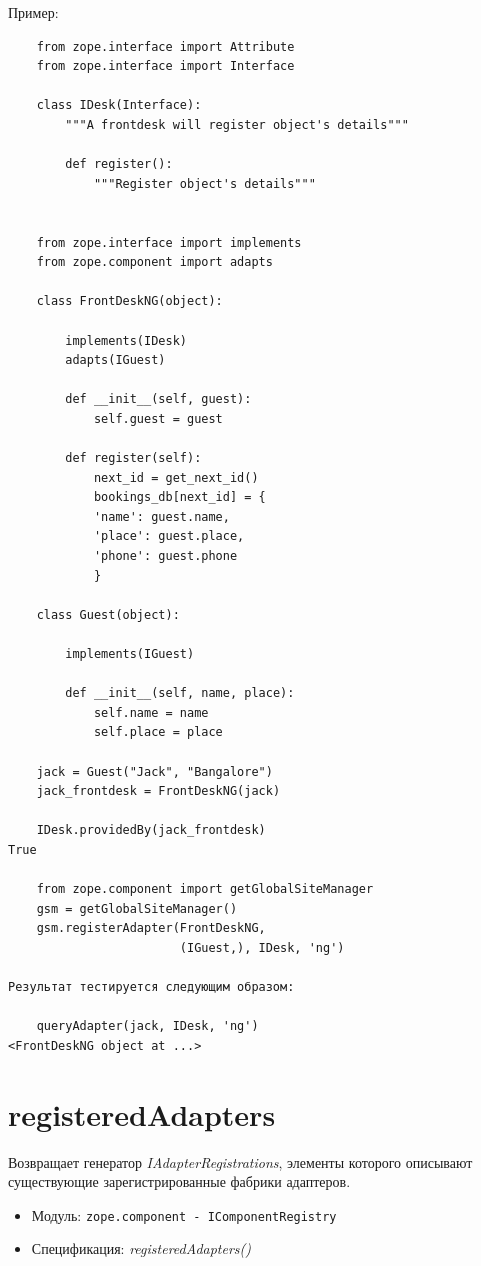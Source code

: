 \documentclass[a4paper,openany,twoside,draft]{book}
\providecommand*{\DUroletitlereference}[1]{\textsl{#1}}
\begin{document}
Пример:

\begin{verbatim}
    from zope.interface import Attribute
    from zope.interface import Interface

    class IDesk(Interface):
        """A frontdesk will register object's details"""

        def register():
            """Register object's details"""


    from zope.interface import implements
    from zope.component import adapts

    class FrontDeskNG(object):

        implements(IDesk)
        adapts(IGuest)

        def __init__(self, guest):
            self.guest = guest

        def register(self):
            next_id = get_next_id()
            bookings_db[next_id] = {
            'name': guest.name,
            'place': guest.place,
            'phone': guest.phone
            }

    class Guest(object):

        implements(IGuest)

        def __init__(self, name, place):
            self.name = name
            self.place = place

    jack = Guest("Jack", "Bangalore")
    jack_frontdesk = FrontDeskNG(jack)

    IDesk.providedBy(jack_frontdesk)
True

    from zope.component import getGlobalSiteManager
    gsm = getGlobalSiteManager()
    gsm.registerAdapter(FrontDeskNG,
                        (IGuest,), IDesk, 'ng')

Результат тестируется следующим образом:

    queryAdapter(jack, IDesk, 'ng')
<FrontDeskNG object at ...>
\end{verbatim}


\section*{registeredAdapters%
  \label{registeredadapters}%
}

Возвращает генератор \DUroletitlereference{IAdapterRegistrations}, элементы которого описывают существующие зарегистрированные фабрики адаптеров.

\begin{itemize}

\item Модуль: \texttt{zope.component - IComponentRegistry}

\item Спецификация: \DUroletitlereference{registeredAdapters()}

\end{itemize}
\end{document}
